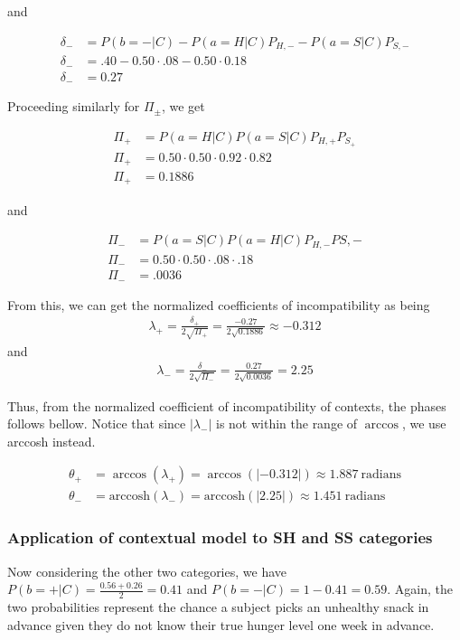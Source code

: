 \documentclass[12pt]{article}
\begin{document}
	and
	
	\begin{align}
	\delta_{-} &= P(b=-|C) - P(a=H|C)P_{H, -} - P(a=S|C)P_{S, -} \\
	\delta_{-} &= .40 - 0.50 \cdot .08 - 0.50 \cdot 0.18 \\
	\delta_{-} &= 0.27	
	\end{align}
	 	
	 Proceeding similarly for $\Pi_\pm$, we get
	
	\begin{align}
	\Pi_{+} &= P(a=H|C)P(a=S|C)P_{H, +}P_{S_+}\\
	\Pi_{+} &= 0.50 \cdot 0.50 \cdot 0.92 \cdot 0.82\\
	\Pi_{+} &= 0.1886
	\end{align}
	
	and 
	
	\begin{align}
	\Pi_- &= P(a = S|C)P(a=H|C)P_{H, -}P{S, -}\\
	\Pi_-&= 0.50 \cdot 0.50 \cdot .08 \cdot .18\\
	\Pi_-&= .0036
	\end{align}

	From this, we can get the normalized coefficients of incompatibility as being
	\begin{align}
	\lambda_{+} = \frac{\delta_{+}}{2 \sqrt{\Pi_{+}}}= \frac{-0.27}{2\sqrt{0.1886}} \approx -0.312
	\end{align}
	and 
	\begin{align}
	\lambda_{-} = \frac{\delta_{-}}{2 \sqrt{\Pi_{-}}}= \frac{0.27}{2\sqrt{0.0036}} = 2.25
	\end{align}

	Thus, from the normalized coefficient of incompatibility of contexts, the phases follows bellow. Notice that since $|\lambda_{-}|$ is not within the range of $\arccos$, we use arccosh instead. 
	
	\begin{align}
	\theta_{+} &= \arccos(\lambda_{+}) = \arccos(|-0.312|) \approx 1.887 \  \text{radians} \\
	\theta_{-} &= \text{arccosh}(\lambda_{-}) = \text{arccosh}(|2.25|) \approx 1.451\ \text{radians}
	\end{align}
	
	\subsubsection{Application of contextual model to SH and SS categories}
	Now considering the other two categories, we have $P(b=+|C) = \frac{0.56+0.26}{2}= 0.41$ and $P(b=-|C) = 1-0.41=0.59$. Again, the two probabilities represent the chance a subject picks an unhealthy snack in advance given they do not know their true hunger level one week in advance. 
	
\end{document}

